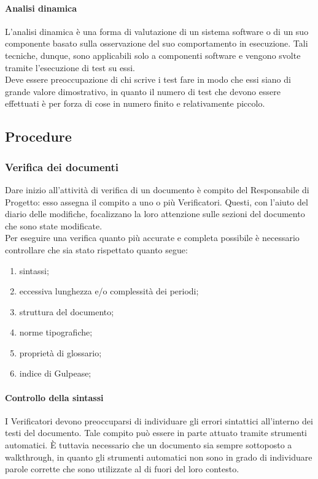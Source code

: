 			\paragraph{Analisi dinamica}
				L'analisi dinamica è una forma di valutazione di un sistema software o di un suo componente basato sulla osservazione del suo 
				comportamento in esecuzione. Tali tecniche, dunque, sono applicabili solo a componenti software e vengono svolte tramite l'esecuzione 
				di test su essi.\\
				Deve essere preoccupazione di chi scrive i test fare in modo che essi siano di grande valore dimostrativo, in quanto il numero di test 
				che devono essere effettuati è per forza di cose in numero finito e relativamente piccolo.
	\subsection{Procedure}
		\subsubsection{Verifica dei documenti}
			Dare inizio all'attività di verifica di un documento è compito del Responsabile di Progetto: esso assegna il compito a uno o più Verificatori. 
			Questi, con l'aiuto del diario delle modifiche, focalizzano la loro attenzione sulle sezioni del documento che sono state modificate.\\
			Per eseguire una verifica quanto più accurate e completa possibile è necessario controllare che sia stato rispettato quanto segue:
			\begin{enumerate}
				\item sintassi;
				\item eccessiva lunghezza e/o complessità dei periodi;
				\item struttura del documento;
				\item norme tipografiche;
				\item proprietà di glossario;
				\item indice di Gulpease;
			\end{enumerate}
			\paragraph{Controllo della sintassi}
				I Verificatori devono preoccuparsi di individuare gli errori sintattici all'interno dei testi del documento. Tale compito può essere in 
				parte attuato tramite strumenti automatici. È tuttavia necessario che un documento sia sempre sottoposto a walkthrough, in quanto gli 
				strumenti automatici non sono in grado di individuare parole corrette che sono utilizzate al di fuori del loro contesto.
